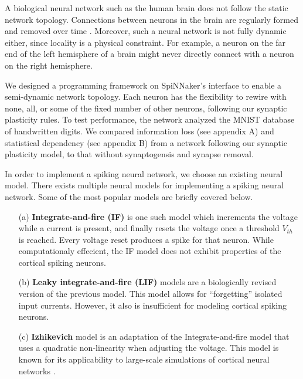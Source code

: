 \documentclass[journal]{./sty/IEEEtran}
\begin{document}
A biological neural network such as the human brain does not follow the static network topology. 
Connections between neurons in the brain are regularly formed and removed over time \cite{SynGen:Levy, StatDepRed:Levy}. 
Moreover, such a neural network is not fully dynamic either, since locality is a physical constraint. 
For example, a neuron on the far end of the left hemisphere of a brain might never directly connect with a neuron on the right hemisphere.

We designed a programming framework on SpiNNaker's interface to enable a semi-dynamic network topology.
Each neuron has the flexibility to rewire with none, all, or some of the fixed number of other neurons, following our synaptic plasticity rules.
To test performance, the network analyzed the MNIST database of handwritten digits. We compared information loss (see appendix A) and statistical dependency (see appendix B) from a network following our synaptic plasticity model, to that without synaptogensis and synapse removal.


In order to implement a spiking neural network, we choose an existing neural model.
There exists multiple neural models for implementing a spiking neural network. 
Some of the most popular models are briefly covered below.
 
\begin{itemize}
\item[(a)] {\bf Integrate-and-fire (IF)} 
 is one such model which increments the voltage while a current is present,
and finally resets the voltage once a threshold $V_{th}$ is reached. 
Every voltage reset produces a spike for that neuron.
While computationaly effecient, the IF model does not exhibit properties of the cortical spiking neurons.
\item[(b)] {\bf Leaky integrate-and-fire (LIF)} 
 models are a biologically revised version of the previous model.
This model allows for ``forgetting'' isolated input currents.
However, it also is insufficient for modeling cortical spiking neurons.
\item[(c)] {\bf Izhikevich} 
 model is an adaptation of the Integrate-and-fire model that uses a quadratic non-linearity when adjusting the voltage.
This model is known for its applicability to large-scale simulations of cortical neural networks \cite{Spikes:Izhi}.
\end{itemize}
\end{document}
